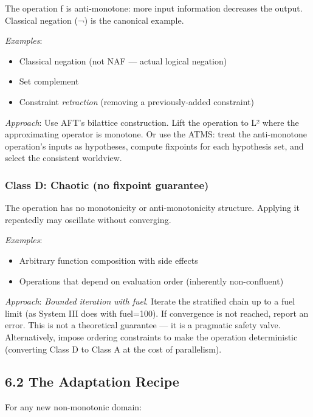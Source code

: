 \documentclass[11pt]{article}
\begin{document}
The operation f is anti-monotone: more input information decreases the output.
Classical negation (¬) is the canonical example.

\emph{Examples}:
\begin{itemize}
\item Classical negation (not NAF — actual logical negation)
\item Set complement
\item Constraint \emph{retraction} (removing a previously-added constraint)
\end{itemize}

\emph{Approach}: Use AFT's bilattice construction. Lift the operation to L² where
the approximating operator is monotone. Or use the ATMS: treat the anti-monotone
operation's inputs as hypotheses, compute fixpoints for each hypothesis set,
and select the consistent worldview.
\subsubsection{Class D: Chaotic (no fixpoint guarantee)}
\label{sec:org0f809dc}

The operation has no monotonicity or anti-monotonicity structure. Applying it
repeatedly may oscillate without converging.

\emph{Examples}:
\begin{itemize}
\item Arbitrary function composition with side effects
\item Operations that depend on evaluation order (inherently non-confluent)
\end{itemize}

\emph{Approach}: \emph{Bounded iteration with fuel}. Iterate the stratified chain up to
a fuel limit (as System III does with fuel=100). If convergence is not reached,
report an error. This is not a theoretical guarantee — it is a pragmatic safety
valve. Alternatively, impose ordering constraints to make the operation
deterministic (converting Class D to Class A at the cost of parallelism).
\subsection{6.2 The Adaptation Recipe}
\label{sec:org2688645}

For any new non-monotonic domain:
\end{document}
